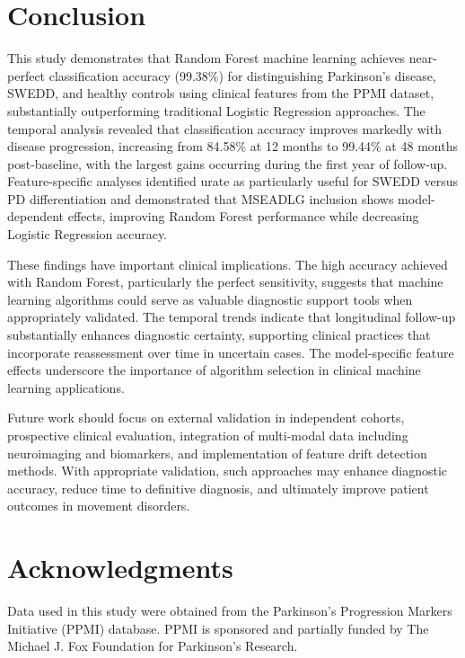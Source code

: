 \documentclass[12pt,a4paper]{article}
\begin{document}
\section{Conclusion}

This study demonstrates that Random Forest machine learning achieves near-perfect classification accuracy (99.38\%) for distinguishing Parkinson's disease, SWEDD, and healthy controls using clinical features from the PPMI dataset, substantially outperforming traditional Logistic Regression approaches. The temporal analysis revealed that classification accuracy improves markedly with disease progression, increasing from 84.58\% at 12 months to 99.44\% at 48 months post-baseline, with the largest gains occurring during the first year of follow-up. Feature-specific analyses identified urate as particularly useful for SWEDD versus PD differentiation and demonstrated that MSEADLG inclusion shows model-dependent effects, improving Random Forest performance while decreasing Logistic Regression accuracy.

These findings have important clinical implications. The high accuracy achieved with Random Forest, particularly the perfect sensitivity, suggests that machine learning algorithms could serve as valuable diagnostic support tools when appropriately validated. The temporal trends indicate that longitudinal follow-up substantially enhances diagnostic certainty, supporting clinical practices that incorporate reassessment over time in uncertain cases. The model-specific feature effects underscore the importance of algorithm selection in clinical machine learning applications.

Future work should focus on external validation in independent cohorts, prospective clinical evaluation, integration of multi-modal data including neuroimaging and biomarkers, and implementation of feature drift detection methods. With appropriate validation, such approaches may enhance diagnostic accuracy, reduce time to definitive diagnosis, and ultimately improve patient outcomes in movement disorders.

\section*{Acknowledgments}
Data used in this study were obtained from the Parkinson's Progression Markers Initiative (PPMI) database. PPMI is sponsored and partially funded by The Michael J. Fox Foundation for Parkinson's Research.
\end{document}
